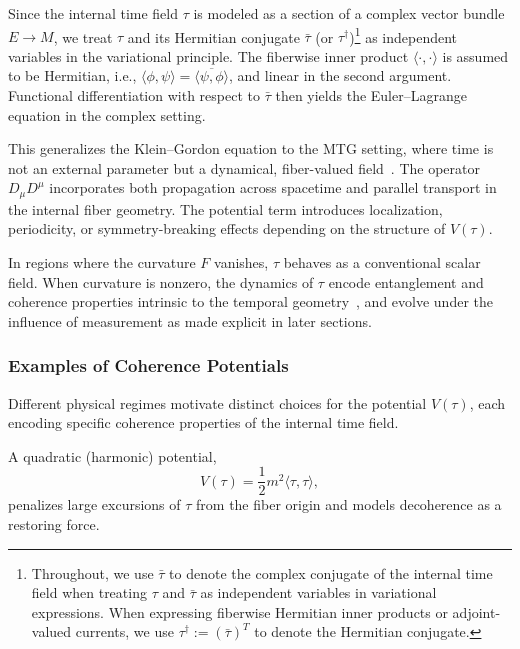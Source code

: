 \documentclass[11pt]{article}
\begin{document}
Since the internal time field $\tau$ is modeled as a section of a complex vector bundle $E \to M$, we treat $\tau$ and its Hermitian conjugate $\bar{\tau}$ (or $\tau^\dagger$)\footnote{Throughout, we use $\bar{\tau}$ to denote the complex conjugate of the internal time field when treating $\tau$ and $\bar{\tau}$ as independent variables in variational expressions. When expressing fiberwise Hermitian inner products or adjoint-valued currents, we use $\tau^\dagger:= (\bar{\tau})^T$ to denote the Hermitian conjugate.
} as independent variables in the variational principle. The fiberwise inner product $\langle \cdot, \cdot \rangle$ is assumed to be Hermitian, i.e., $\langle \phi, \psi \rangle = \overline{\langle \psi, \phi \rangle}$, and linear in the second argument. Functional differentiation with respect to $\bar{\tau}$ then yields the Euler–Lagrange equation in the complex setting.

This generalizes the Klein--Gordon equation to the MTG setting, where time is not an external parameter but a dynamical, fiber-valued field~\cite{kuchar1991time, rovelli1990quantum}. The operator \( D_\mu D^\mu \) incorporates both propagation across spacetime and parallel transport in the internal fiber geometry. The potential term introduces localization, periodicity, or symmetry-breaking effects depending on the structure of \( V(\tau) \).

In regions where the curvature \( F \) vanishes, \( \tau \) behaves as a conventional scalar field. When curvature is nonzero, the dynamics of \( \tau \) encode entanglement and coherence properties intrinsic to the temporal geometry~\cite{debianchi2024achronotopic}, and evolve under the influence of measurement as made explicit in later sections.

\subsubsection{Examples of Coherence Potentials}

Different physical regimes motivate distinct choices for the potential \( V(\tau) \), each encoding specific coherence properties of the internal time field.

A quadratic (harmonic) potential,
\begin{equation}
V(\tau) = \frac{1}{2} m^2 \langle \tau, \tau \rangle,
\end{equation}
penalizes large excursions of \( \tau \) from the fiber origin and models decoherence as a restoring force.
\end{document}
